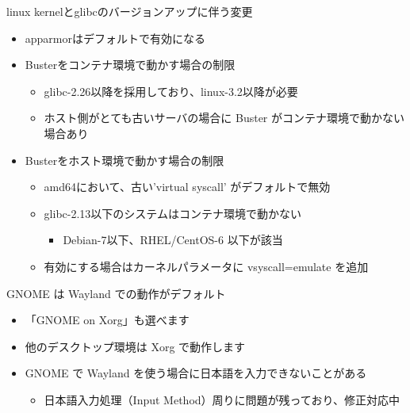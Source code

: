 \documentclass[mingoth,a4paper]{jsarticle}
\begin{document}
%
%  
%    
%



linux kernelとglibcのバージョンアップに伴う変更
  
\begin{itemize}
\item apparmorはデフォルトで有効になる
\item Busterをコンテナ環境で動かす場合の制限
  \begin{itemize}
  \item glibc-2.26以降を採用しており、linux-3.2以降が必要
  \item ホスト側がとても古いサーバの場合に Buster がコンテナ環境で動かない場合あり
  \end{itemize}
\item Busterをホスト環境で動かす場合の制限
  \begin{itemize}
  \item amd64において、古い'virtual syscall' がデフォルトで無効
  \item glibc-2.13以下のシステムはコンテナ環境で動かない
    \begin{itemize}
    \item Debian-7以下、RHEL/CentOS-6 以下が該当
    \end{itemize}
  \item 有効にする場合はカーネルパラメータに vsyscall=emulate を追加
  \end{itemize}
\end{itemize}





GNOME は Wayland での動作がデフォルト

\begin{itemize}
\item 「GNOME on Xorg」も選べます
\item 他のデスクトップ環境は Xorg で動作します
\item GNOME で Wayland を使う場合に日本語を入力できないことがある
  \begin{itemize}
  \item 日本語入力処理（Input Method）周りに問題が残っており、修正対応中
  \end{itemize}
\end{itemize}
\end{document}

